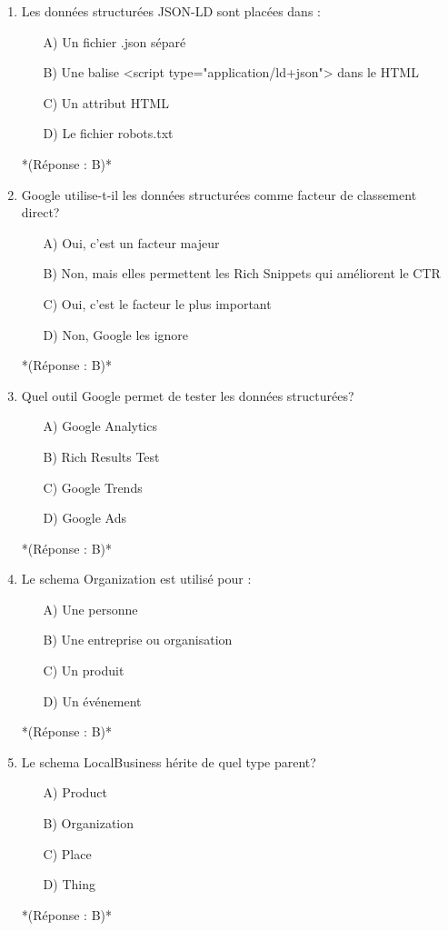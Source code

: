 \documentclass[12pt,a4paper,twoside]{report}
\begin{document}
\begin{enumerate}
\item Les données structurées JSON-LD sont placées dans :
\begin{itemize}
\item[A)] Un fichier .json séparé
\item[B)] Une balise <script type="application/ld+json"> dans le HTML
\item[C)] Un attribut HTML
\item[D)] Le fichier robots.txt
\end{itemize}
*(Réponse : B)*

\item Google utilise-t-il les données structurées comme facteur de classement direct?
\begin{itemize}
\item[A)] Oui, c'est un facteur majeur
\item[B)] Non, mais elles permettent les Rich Snippets qui améliorent le CTR
\item[C)] Oui, c'est le facteur le plus important
\item[D)] Non, Google les ignore
\end{itemize}
*(Réponse : B)*

\item Quel outil Google permet de tester les données structurées?
\begin{itemize}
\item[A)] Google Analytics
\item[B)] Rich Results Test
\item[C)] Google Trends
\item[D)] Google Ads
\end{itemize}
*(Réponse : B)*

\item Le schema Organization est utilisé pour :
\begin{itemize}
\item[A)] Une personne
\item[B)] Une entreprise ou organisation
\item[C)] Un produit
\item[D)] Un événement
\end{itemize}
*(Réponse : B)*

\item Le schema LocalBusiness hérite de quel type parent?
\begin{itemize}
\item[A)] Product
\item[B)] Organization
\item[C)] Place
\item[D)] Thing
\end{itemize}
*(Réponse : B)*


\end{enumerate}
\end{document}
